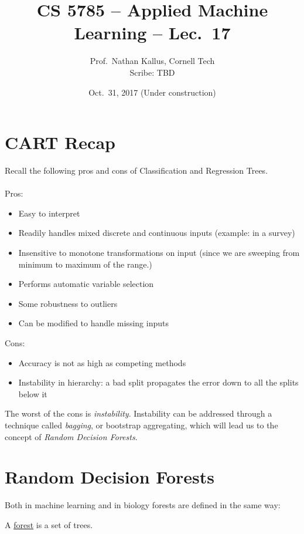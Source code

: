 \documentclass[a4paper]{article}
\title{CS 5785 -- Applied Machine Learning -- Lec.\ 17}
\author{Prof.\ Nathan Kallus, Cornell Tech\\Scribe: TBD}
\date{Oct.\ 31, 2017 (Under construction)}
\begin{document}
\maketitle

\section{CART Recap}
Recall the following pros and cons of Classification and Regression Trees.
\\
\\
Pros:
\begin{itemize}
\item Easy to interpret
\item Readily handles mixed discrete and continuous inputs (example: in a survey)
\item Insensitive to monotone transformations on input (since we are sweeping from minimum to maximum of the range.)
\item Performs automatic variable selection
\item Some robustness to outliers
\item Can be modified to handle missing inputs
\end{itemize}
Cons:
\begin{itemize}
\item Accuracy is not as high as competing methods
\item Instability in hierarchy: a bad split propagates the error down to all the splits below it
\end{itemize}

The worst of the cons is \textit{instability}. Instability can be addressed through a technique called \textit{bagging}, or bootstrap aggregating, which will lead us to the concept of \textit{Random Decision Forests}.

\section{Random Decision Forests}
Both in machine learning and in biology forests are defined in the same way:
\newenvironment{definition}[1][Definition]{\begin{trivlist}
\item[\hskip \labelsep {\bfseries #1}]}{\end{trivlist}}

\begin{definition}
A \underline{forest} is a set of trees.
\end{definition}
\end{document}
